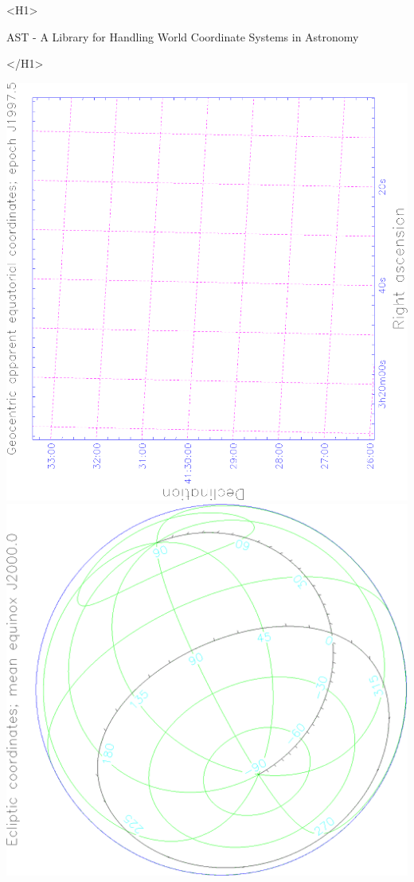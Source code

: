 \documentclass[twoside,11pt]{article}
\newcommand{\stardoctitlehtml} {AST - A Library for Handling World Coordinate
                                      Systems in Astronomy}
\newcommand{\xlabel}[1]{}
\begin{document}
\begin{htmlonly}
   \xlabel{}
   \begin{rawhtml} <H1> \end{rawhtml}
      \stardoctitlehtml
   \begin{rawhtml} </H1> \end{rawhtml}

   \includegraphics[scale=0.3,angle=-90]{sun210_figures/fronta.eps}\hfill
   \includegraphics[scale=0.3,angle=-90]{sun210_figures/frontb.eps}\hfill

\end{htmlonly}
\end{document}
